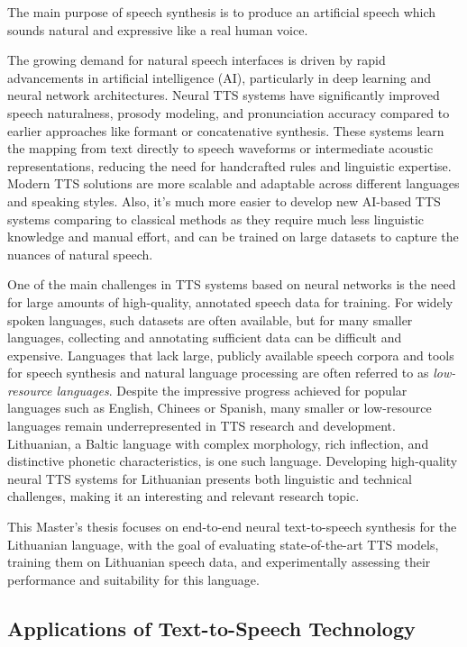 \documentclass[
         english, %
    monochrome, %
]{VUMIFSEMasterThesis}
\begin{document}
The main purpose of speech synthesis is to produce an artificial speech which sounds natural and expressive like a real human voice.

The growing demand for natural speech interfaces is driven by rapid advancements in artificial intelligence (AI), particularly in deep learning and neural network architectures. Neural TTS systems have significantly improved speech naturalness, prosody modeling, and pronunciation accuracy compared to earlier approaches like formant or concatenative synthesis. These systems learn the mapping from text directly to speech waveforms or intermediate acoustic representations, reducing the need for handcrafted rules and linguistic expertise. Modern TTS solutions are more scalable and adaptable across different languages and speaking styles. Also, it's much more easier to develop new AI-based TTS systems comparing to classical methods as they require much less linguistic knowledge and manual effort, and can be trained on large datasets to capture the nuances of natural speech.

One of the main challenges in TTS systems based on neural networks is the need for large amounts of high-quality, annotated speech data for training. For widely spoken languages, such datasets are often available, but for many smaller languages, collecting and annotating sufficient data can be difficult and expensive. Languages that lack large, publicly available speech corpora and tools for speech synthesis and natural language processing are often referred to as \emph{low-resource languages}. Despite the impressive progress achieved for popular languages such as English, Chinees or Spanish, many smaller or low-resource languages remain underrepresented in TTS research and development. Lithuanian, a Baltic language with complex morphology, rich inflection, and distinctive phonetic characteristics, is one such language. Developing high-quality neural TTS systems for Lithuanian presents both linguistic and technical challenges, making it an interesting and relevant research topic.

This Master’s thesis focuses on end-to-end neural text-to-speech synthesis for the Lithuanian language, with the goal of evaluating state-of-the-art TTS models, training them on Lithuanian speech data, and experimentally assessing their performance and suitability for this language.

\subsection*{Applications of Text-to-Speech Technology}
\end{document}
